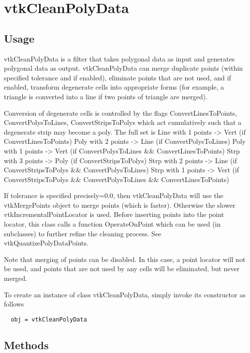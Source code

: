 \section{vtkCleanPolyData}

\subsection{Usage}

 vtkCleanPolyData is a filter that takes polygonal data as input and
 generates polygonal data as output. vtkCleanPolyData can merge duplicate
 points (within specified tolerance and if enabled), eliminate points
 that are not used, and if enabled, transform degenerate cells into
 appropriate forms (for example, a triangle is converted into a line
 if two points of triangle are merged).

 Conversion of degenerate cells is controlled by the flags
 ConvertLinesToPoints, ConvertPolysToLines, ConvertStripsToPolys which act
 cumulatively such that a degenerate strip may become a poly.
 The full set is
 Line with 1 points -> Vert (if ConvertLinesToPoints)
 Poly with 2 points -> Line (if ConvertPolysToLines)
 Poly with 1 points -> Vert (if ConvertPolysToLines \&\& ConvertLinesToPoints)
 Strp with 3 points -> Poly (if ConvertStripsToPolys)
 Strp with 2 points -> Line (if ConvertStripsToPolys \&\& ConvertPolysToLines)
 Strp with 1 points -> Vert (if ConvertStripsToPolys \&\& ConvertPolysToLines
   \&\& ConvertLinesToPoints)

 If tolerance is specified precisely=0.0, then vtkCleanPolyData will use
 the vtkMergePoints object to merge points (which is faster). Otherwise the
 slower vtkIncrementalPointLocator is used.  Before inserting points into the point
 locator, this class calls a function OperateOnPoint which can be used (in
 subclasses) to further refine the cleaning process. See
 vtkQuantizePolyDataPoints.

 Note that merging of points can be disabled. In this case, a point locator
 will not be used, and points that are not used by any cells will be
 eliminated, but never merged.

To create an instance of class vtkCleanPolyData, simply
invoke its constructor as follows
\begin{verbatim}
  obj = vtkCleanPolyData
\end{verbatim}
\subsection{Methods}

